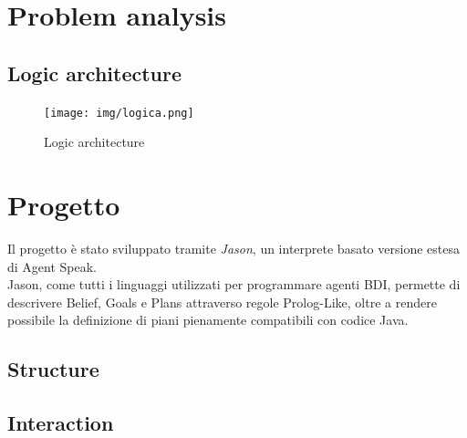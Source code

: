 \documentclass{llncs}
\newcommand{\labelsec}[1]{\label{sec:#1}}
\begin{document}
\section{Problem analysis}
\labelsec{ProblemAnalysis}
\subsection{Logic architecture}
\begin{figure}[htbp]
  \centering
   \texttt{[image: img/logica.png]}
  \caption{Logic architecture}
\end{figure}
\newpage
\section{Progetto}
\labelsec{Progetto}
Il progetto è stato sviluppato tramite \textit{Jason}, un interprete basato versione estesa di Agent Speak.\\
Jason, come tutti i linguaggi utilizzati per programmare agenti BDI, permette di descrivere Belief, Goals e Plans attraverso regole Prolog-Like, oltre a rendere possibile la definizione di piani pienamente compatibili con codice Java.\\
\newpage
\subsection{Structure}

\subsection{Interaction}
\newpage
\end{document}
